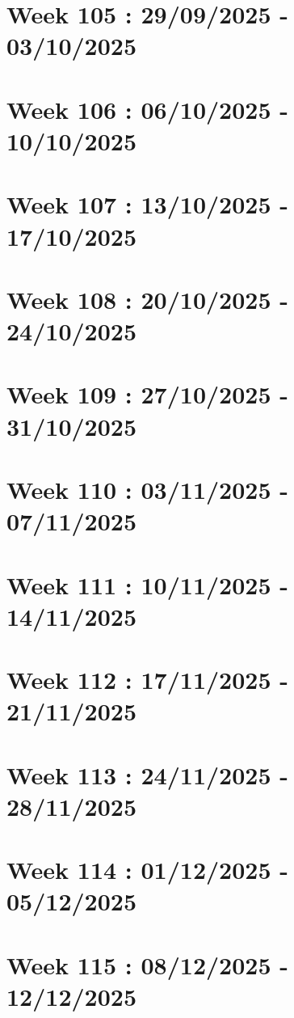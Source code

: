 \documentclass[french]{article}
\begin{document}
	\section{Week 105 : 29/09/2025 - 03/10/2025}

	\section{Week 106 : 06/10/2025 - 10/10/2025}

	\section{Week 107 : 13/10/2025 - 17/10/2025}

	\section{Week 108 : 20/10/2025 - 24/10/2025}

	\section{Week 109 : 27/10/2025 - 31/10/2025}

	\section{Week 110 : 03/11/2025 - 07/11/2025}

	\section{Week 111 : 10/11/2025 - 14/11/2025}

	\section{Week 112 : 17/11/2025 - 21/11/2025}

	\section{Week 113 : 24/11/2025 - 28/11/2025}

	\section{Week 114 : 01/12/2025 - 05/12/2025}

	\section{Week 115 : 08/12/2025 - 12/12/2025}
\end{document}
